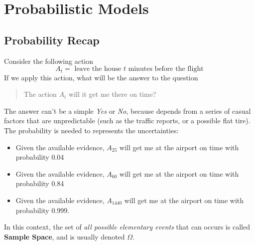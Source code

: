 \documentclass[10pt, letterpaper]{report}
\begin{document}
\chapter{Probabilistic Models}
\section{Probability Recap}
Consider the following action\begin{equation}
    A_t=\text{ leave the house $t$ minutes before the flight}
\end{equation}
If we apply this action, what will be the answer to the question\begin{quote}
    The action $A_t$ will it get me there on time?
\end{quote}
The answer can't be a simple \textit{Yes} or \textit{No}, because depends from a series of casual factors that are unpredictable (such as the traffic reports, or a possible flat tire). The probability is needed to represents the uncertainties:\begin{itemize}
\item Given the available evidence, $A_{25}$ will get me at the airport on time with
probability 0.04
 \item Given the available evidence, $A_{60}$ will get me at the airport on time with
probability 0.84
 \item Given the available evidence, $A_{1440}$ will get me at the airport on time with
probability 0.999.
\end{itemize}
In this context, the set of \textit{all possible elementary events} that can occurs is called \textbf{Sample Space}, and is usually denoted $\Omega$.
\end{document}

